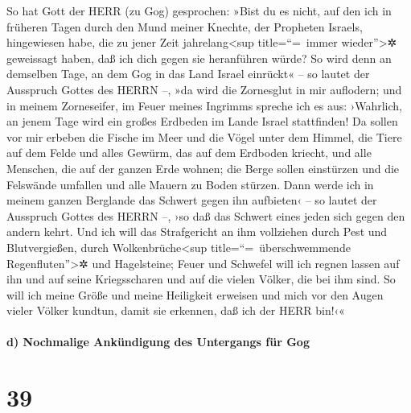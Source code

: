 So hat Gott der HERR (zu Gog) gesprochen: »Bist du es
nicht, auf den ich in früheren Tagen durch den Mund meiner Knechte, der
Propheten Israels, hingewiesen habe, die zu jener Zeit
jahrelang\textless sup title=``=~immer wieder''\textgreater✲ geweissagt
haben, daß ich dich gegen sie heranführen würde? So wird
denn an demselben Tage, an dem Gog in das Land Israel einrückt« -- so
lautet der Ausspruch Gottes des HERRN --, »da wird die Zornesglut in mir
auflodern; und in meinem Zorneseifer, im Feuer meines
Ingrimms spreche ich es aus: ›Wahrlich, an jenem Tage wird ein großes
Erdbeden im Lande Israel stattfinden! Da sollen vor mir
erbeben die Fische im Meer und die Vögel unter dem Himmel, die Tiere auf
dem Felde und alles Gewürm, das auf dem Erdboden kriecht, und alle
Menschen, die auf der ganzen Erde wohnen; die Berge sollen einstürzen
und die Felswände umfallen und alle Mauern zu Boden stürzen.
Dann werde ich in meinem ganzen Berglande das Schwert
gegen ihn aufbieten‹ -- so lautet der Ausspruch Gottes des HERRN --, ›so
daß das Schwert eines jeden sich gegen den andern kehrt.
Und ich will das Strafgericht an ihm vollziehen durch
Pest und Blutvergießen, durch Wolkenbrüche\textless sup
title=``=~überschwemmende Regenfluten''\textgreater✲ und Hagelsteine;
Feuer und Schwefel will ich regnen lassen auf ihn und auf seine
Kriegsscharen und auf die vielen Völker, die bei ihm sind.
So will ich meine Größe und meine Heiligkeit erweisen und
mich vor den Augen vieler Völker kundtun, damit sie erkennen, daß ich
der HERR bin!‹«

\hypertarget{d-nochmalige-ankuxfcndigung-des-untergangs-fuxfcr-gog}{%
\paragraph{d) Nochmalige Ankündigung des Untergangs für
Gog}\label{d-nochmalige-ankuxfcndigung-des-untergangs-fuxfcr-gog}}

\hypertarget{section-38}{%
\section{39}\label{section-38}}


